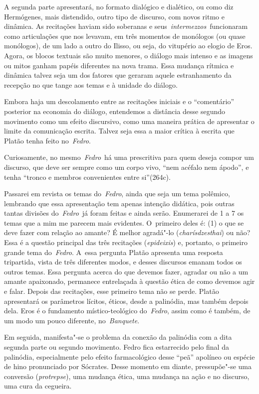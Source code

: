 A segunda parte apresentará, no formato dialógico e dialético, ou como
diz Hermógenes, mais distendido, outro tipo de discurso, com novos ritmo
e dinâmica. As recitações haviam sido soberanas e
seus~\emph{intermezzos}~funcionaram como articulações que nos levavam,
em três momentos de monólogos (ou quase monólogos), de um lado a outro
do Ilisso, ou seja, do vitupério ao elogio de Eros. Agora, os blocos
textuais são muito menores, o diálogo mais intenso e as imagens ou mitos
ganham papéis diferentes na nova trama. Essa mudança rítmica e dinâmica
talvez seja um dos fatores que geraram aquele estranhamento da recepção
no que tange aos temas e à unidade do diálogo.

Embora haja um descolamento entre as recitações iniciais e o ``comentário''
posterior na economia do diálogo, entendemos a distância desse segundo
movimento como um efeito discursivo, como uma maneira prática de
apresentar o limite da comunicação escrita. Talvez seja essa a maior
crítica à escrita que Platão tenha feito no~\emph{Fedro}.

Curiosamente, no mesmo~\emph{Fedro}~há uma prescritiva para quem deseja
compor um discurso, que deve ser sempre como um corpo vivo, ``nem
acéfalo nem ápodo'', e tenha ``tronco e membros convenientes entre
si''(264c).

Passarei em revista os temas do~\emph{Fedro}, ainda que seja um tema
polêmico, lembrando que essa apresentação tem apenas intenção didática,
pois outras tantas divisões do~\emph{Fedro}~já foram feitas e ainda
serão. Enumerarei de 1 a 7 os temas que a mim me parecem mais evidentes.
O~primeiro deles é: (1) o que se deve fazer com relação ao amante? É
melhor agradá"-lo (\emph{charísdzesthai}) ou não? Essa é a questão
principal das três recitações (\emph{epideixis}) e, portanto, o primeiro
grande tema do~\emph{Fedro}. A~essa pergunta Platão apresenta uma
resposta tripartida, vista de três diferentes modos, e desses discursos
emanam todos os outros temas. Essa pergunta acerca do que devemos fazer,
agradar ou não a um amante apaixonado, permanece entrelaçada à questão
ética de como devemos agir e falar. Depois das recitações, esse primeiro
tema não se perde. Platão apresentará os parâmetros lícitos, éticos,
desde a palinódia, mas também depois dela. Eros é o fundamento místico-teológico
 do~\emph{Fedro}, assim como é também, de um modo um pouco
diferente, no~\emph{Banquete}.

Em seguida, manifesta"-se o problema da conexão da palinódia com a dita
segunda parte ou segundo movimento. Fedro fica estarrecido pelo final da
palinódia, especialmente pelo efeito farmacológico desse ``peã''
apolíneo ou espécie de hino pronunciado por Sócrates. Desse momento em
diante, pressupõe"-se uma conversão (\emph{protrepse}), uma mudança
ética, uma mudança na ação e no discurso, uma cura da cegueira.

